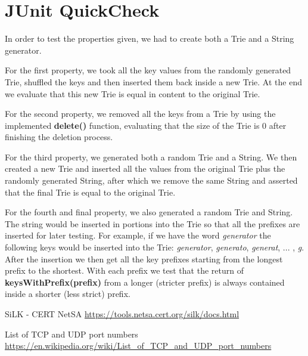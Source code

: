 \documentclass[12pt]{article}
\begin{document}
\section[JUnit QuickCheck]{JUnit QuickCheck}
In order to test the properties given, we had to create both a Trie and a String generator.

For the first property, we took all the key values from the randomly generated Trie, shuffled the keys and then inserted them back inside a new Trie. At the end we evaluate that this new Trie is equal in content to the original Trie.

For the second property, we removed all the keys from a Trie by using the implemented \textbf{delete()} function, evaluating that the size of the Trie is 0 after finishing the deletion process.

For the third property, we generated both a random Trie and a String. We then created a new Trie and inserted all the values from the original Trie plus the randomly generated String, after which we remove the same String and asserted that the final Trie is equal to the original Trie.

For the fourth and final property, we also generated a random Trie and String. The string would be inserted in portions into the Trie so that all the prefixes are inserted for later testing. For example, if we have the word \textit{generator} the following keys would be inserted into the Trie: \textit{generator}, \textit{generato}, \textit{generat}, ... , \textit{g}. After the insertion we then get all the key prefixes starting from the longest prefix to the shortest. With each prefix we test that the return of \textbf{keysWithPrefix(prefix)} from a longer (stricter prefix) is always contained inside a shorter (less strict) prefix.

\begin{thebibliography}{9}
SiLK - CERT NetSA
\url{https://tools.netsa.cert.org/silk/docs.html}

List of TCP and UDP port numbers
\url{https://en.wikipedia.org/wiki/List_of_TCP_and_UDP_port_numbers}



\end{thebibliography}



\end{document}
